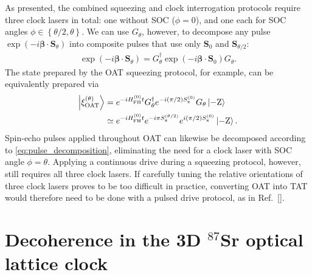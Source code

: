 \documentclass[aps,prx,superscriptaddress,notitlepage,twocolumn,longbibliography]{revtex4-1}
\renewcommand{\t}{\text} %
\newcommand{\p}[1]{\left(#1\right)} %
\renewcommand{\set}[1]{\left\{#1\right\}} %
\renewcommand{\c}{\cdot} %
\renewcommand{\v}{\bm} %
\renewcommand{\ket}{\Ket}
\newcommand{\x}{\text{x}}
\begin{document}
As presented, the combined squeezing and clock interrogation protocols require three clock lasers in total: one without SOC ($\phi=0$), and one each for SOC angles $\phi\in\set{\theta/2,\theta}$.
We can use $G_\theta$, however, to decompose any pulse $\exp\p{-i\v\beta\c\v S_\theta}$ into composite pulses that use only $\v S_0$ and $\v S_{\theta/2}$:
\begin{align}
  \exp\p{-i\v\beta\c\v S_\theta}
  = G_\theta^\dag \exp\p{-i\v\beta\c\v S_0} G_\theta.
  \label{eq:pulse_decomposition}
\end{align}
The state prepared by the OAT squeezing protocol, for example, can be equivalently prepared via
\begin{align}
  \ket{\xi_{\t{OAT}}^{(\theta)}}
  &= e^{-i H_{\t{FH}}^{(0)}t} G_\theta^\dag
  e^{-i\p{\pi/2}S_\x^{(0)}} G_\theta \ket{-\t{Z}} \notag \\
  &\simeq e^{-i H_{\t{FH}}^{(0)}t} e^{-i\pi S_\x^{(\theta/2)}}
  e^{i\p{\pi/2} S_\x^{(0)}} \ket{-\t{Z}}.
\end{align}
Spin-echo pulses applied throughout OAT can likewise be decomposed according to \eqref{eq:pulse_decomposition}, eliminating the need for a clock laser with SOC angle $\phi=\theta$.
Applying a continuous drive during a squeezing protocol, however, still requires all three clock lasers.
If carefully tuning the relative orientations of three clock lasers proves to be too difficult in practice, converting OAT into TAT would therefore need to be done with a pulsed drive protocol, as in Ref.~[].


\section{Decoherence in the 3D $^{87}$Sr optical lattice clock}
\label{sec:decoherence}
\end{document}
